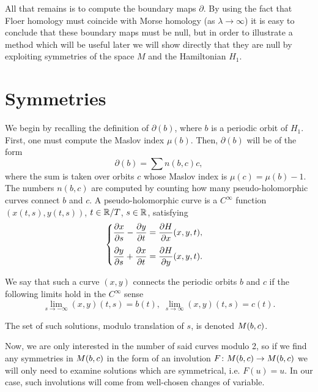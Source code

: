 All that remains is to compute the boundary maps $\partial$. By using the fact that Floer homology must coincide with Morse homology (as $\lambda \to \infty$) it is easy to conclude that these boundary maps must be null, but in order to illustrate a method which will be useful later we will show directly that they are null by exploiting symmetries of the space $M$ and the Hamiltonian $H_1$.

\section{Symmetries}\label{sec:symmetries}

We begin by recalling the definition of $\partial(b)$, where $b$ is a periodic orbit of $H_1$. First, one must compute the Maslov index $\mu(b)$. Then, $\partial(b)$ will be of the form
\begin{equation}
\partial(b) = \sum n(b,c) c,
\end{equation}
where the sum is taken over orbits $c$ whose Maslov index is $\mu(c) = \mu(b)-1$. The numbers $n(b,c)$ are computed by counting how many pseudo-holomorphic curves connect $b$ and $c$. A pseudo-holomorphic curve is a $C^\infty$ function $(x(t,s), y(t,s))$, $t \in \mathbb{R} / T$, $s \in \mathbb{R}$, satisfying
\begin{equation}\label{pseudoholomorphic}
\begin{cases}
\displaystyle \diffp x s - \diffp y t = \diffp H x(x,y,t),\\[1em]
\displaystyle \diffp y s + \diffp x t = \diffp H y(x,y,t).
\end{cases}
\end{equation}

We say that such a curve $(x,y)$ connects the periodic orbits $b$ and $c$ if the following limits hold in the $C^\infty$ sense
\begin{equation}
\lim_{s \to -\infty} (x,y)(t,s) = b(t), \; \lim_{s \to \infty} (x,y)(t,s) = c(t).
\end{equation}

The set of such solutions, modulo translation of $s$, is denoted $M(b,c)$.

Now, we are only interested in the number of said curves modulo 2, so if we find any symmetries in $M(b,c)$ in the form of an involution $F \colon M(b,c) \to M(b,c)$ we will only need to examine solutions which are symmetrical, i.e. $F(u) = u$. In our case, such involutions will come from well-chosen changes of variable.

